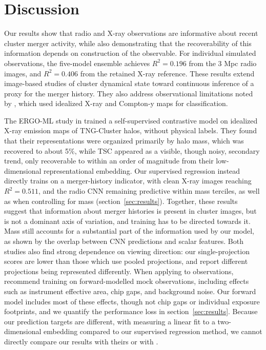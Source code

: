 \section{Discussion}
\label{sec:discussion}

Our results show that radio and X-ray observations are informative about recent cluster merger activity, while also demonstrating that the recoverability of this information depends on construction of the observable.
For individual simulated observations, the five-model ensemble achieves $R^2 = 0.196$ from the 3 Mpc radio images, and $R^2 = 0.406$ from the retained X-ray reference.
These results extend image-based studies of cluster dynamical state toward continuous inference of a proxy for the merger history.
They also address observational limitations noted by \cite{Arendt2024}, which used idealized X-ray and Compton-y maps for classification.

The ERGO-ML study in \citet{Chadayammuri2026} trained a self-supervised contrastive model on idealized X-ray emission maps of TNG-Cluster halos, without physical labels.
They found that their representations were organized primarily by halo mass, which was recovered to about 5\%, while TSC appeared as a visible, though noisy, secondary trend, only recoverable to within an order of magnitude from their low-dimensional representational embedding.
Our supervised regression instead directly trains on a merger-history indicator, with clean X-ray images reaching $R^2=0.511$, and the radio CNN remaining predictive within mass terciles, as well as when controlling for mass (section~\ref{sec:results}).
Together, these results suggest that information about merger histories is present in cluster images, but is not a dominant axis of variation, and training has to be directed towards it.
Mass still accounts for a substantial part of the information used by our model, as shown by the overlap between CNN predictions and scalar features.
Both studies also find strong dependence on viewing direction: our single-projection scores are lower than those which use pooled projections, and \citet{Chadayammuri2026} report different projections being represented differently.
When applying to observations, \citet{Chadayammuri2026} recommend training on forward-modelled mock observations, including effects such as instrument effective area, chip gaps, and background noise.
Our forward model includes most of these effects, though not chip gaps or individual exposure footprints, and we quantify the performance loss in section~\ref{sec:results}.
Because our prediction targets are different, with \citet{Chadayammuri2026} measuring a linear fit to a two-dimensional embedding compared to our supervised regression method, we cannot directly compare our results with theirs or with \citet{Arendt2024}.

